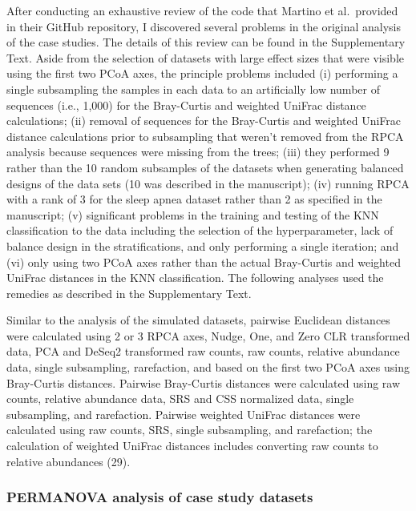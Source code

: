 \documentclass[
  11pt,
]{article}
\begin{document}
After conducting an exhaustive review of the code that Martino et
al.~provided in their GitHub repository, I discovered several problems
in the original analysis of the case studies. The details of this review
can be found in the Supplementary Text. Aside from the selection of
datasets with large effect sizes that were visible using the first two
PCoA axes, the principle problems included (i) performing a single
subsampling the samples in each data to an artificially low number of
sequences (i.e., 1,000) for the Bray-Curtis and weighted UniFrac
distance calculations; (ii) removal of sequences for the Bray-Curtis and
weighted UniFrac distance calculations prior to subsampling that weren't
removed from the RPCA analysis because sequences were missing from the
trees; (iii) they performed 9 rather than the 10 random subsamples of
the datasets when generating balanced designs of the data sets (10 was
described in the manuscript); (iv) running RPCA with a rank of 3 for the
sleep apnea dataset rather than 2 as specified in the manuscript; (v)
significant problems in the training and testing of the KNN
classification to the data including the selection of the
hyperparameter, lack of balance design in the stratifications, and only
performing a single iteration; and (vi) only using two PCoA axes rather
than the actual Bray-Curtis and weighted UniFrac distances in the KNN
classification. The following analyses used the remedies as described in
the Supplementary Text.

Similar to the analysis of the simulated datasets, pairwise Euclidean
distances were calculated using 2 or 3 RPCA axes, Nudge, One, and Zero
CLR transformed data, PCA and DeSeq2 transformed raw counts, raw counts,
relative abundance data, single subsampling, rarefaction, and based on
the first two PCoA axes using Bray-Curtis distances. Pairwise
Bray-Curtis distances were calculated using raw counts, relative
abundance data, SRS and CSS normalized data, single subsampling, and
rarefaction. Pairwise weighted UniFrac distances were calculated using
raw counts, SRS, single subsampling, and rarefaction; the calculation of
weighted UniFrac distances includes converting raw counts to relative
abundances (29).

\subsubsection{PERMANOVA analysis of case study
datasets}\label{permanova-analysis-of-case-study-datasets}
\end{document}
